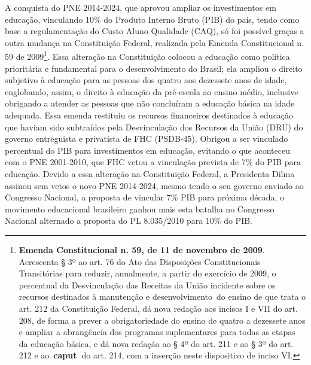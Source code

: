 A conquista do PNE 2014-2024, que aprovou ampliar os investimentos em
educação, vinculando 10\% do Produto Interno Bruto (PIB) do país, tendo
como base a regulamentação do Custo Aluno Qualidade (CAQ), só foi
possível graças a outra mudança na Constituição Federal, realizada pela
Emenda Constitucional n. 59 de 2009\footnote{\textbf{Emenda
  Constitucional n. 59, de 11 de novembro de 2009}. Acrescenta § 3º ao
  art. 76 do Ato das Disposições Constitucionais Transitórias para
  reduzir, anualmente, a partir do exercício de 2009, o percentual da
  Desvinculação das Receitas da União incidente sobre os recursos
  destinados à manutenção e desenvolvimento~do ensino de que trata o
  art. 212 da Constituição Federal, dá nova redação aos incisos I e VII
  do art. 208, de forma a prever a obrigatoriedade do ensino de quatro a
  dezessete anos e ampliar a abrangência dos programas suplementares
  para todas as etapas da educação básica, e dá nova redação ao § 4º do
  art. 211 e ao § 3º do art. 212 e ao~\textbf{caput~}do art. 214, com a
  inserção neste dispositivo de inciso VI.}. Essa alteração na
Constituição colocou a educação como política prioritária e fundamental
para o desenvolvimento do Brasil; ela ampliou o direito subjetivo à
educação para as pessoas dos quatro aos dezessete anos de idade,
englobando, assim, o direito à educação da pré-escola ao ensino médio,
inclusive obrigando a atender as pessoas que não concluíram a educação
básica na idade adequada. Essa emenda restituiu os recursos financeiros
destinados à educação que haviam sido subtraídos pela Desvinculação dos
Recursos da União (DRU) do governo entreguista e privatista de FHC
(PSDB-45). Obrigou a ser vinculado percentual do PIB para investimentos
em educação, evitando o que aconteceu com o PNE 2001-2010, que FHC vetou
a vinculação prevista de 7\% do PIB para educação. Devido a essa
alteração na Constituição Federal, a Presidenta Dilma assinou sem vetos
o novo PNE 2014-2024, mesmo tendo o seu governo enviado ao Congresso
Nacional, a proposta de vincular 7\% PIB para próxima década, o
movimento educacional brasileiro ganhou mais esta batalha no Congresso
Nacional alternado a proposta do PL 8.035/2010 para 10\% do PIB.


